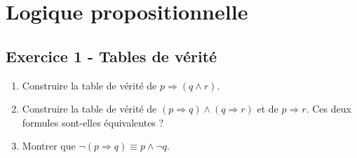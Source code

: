 \documentclass[12pt,a4paper]{article}
\begin{document}
\newpage
\section{Logique propositionnelle}

\subsection*{Exercice 1 - Tables de vérité \niveau{\facile}}

\begin{boiteexercice}
\begin{enumerate}
  \item Construire la table de vérité de $p\Rightarrow(q\wedge r)$.
  \item Construire la table de vérité de $(p\Rightarrow q)\wedge(q\Rightarrow r)$ et de $p\Rightarrow r$. Ces deux formules sont-elles équivalentes ?
  \item Montrer que $\neg(p\Rightarrow q)\equiv p\wedge\neg q$.
\end{enumerate}
\end{boiteexercice}
\end{document}
